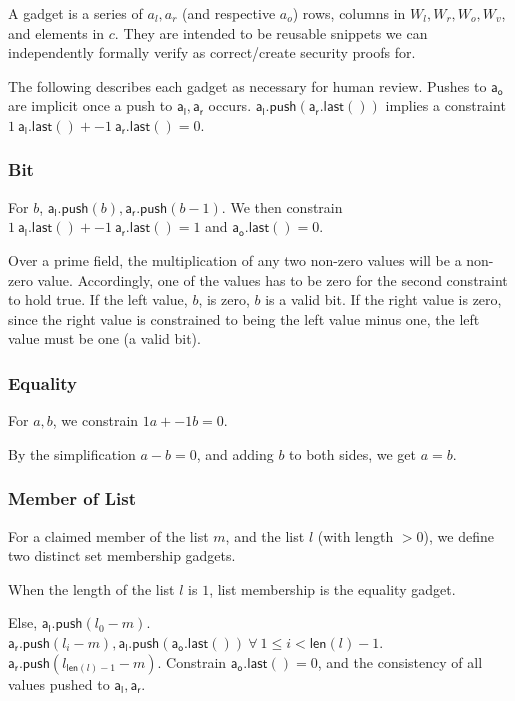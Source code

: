\documentclass[]{article}
\begin{document}
A gadget is a series of $a_l, a_r$ (and respective $a_o$) rows, columns in $W_l, W_r, W_o, W_v$, and elements in $c$. They are intended to be reusable snippets we can independently formally verify as correct/create security proofs for.

\newcommand{\al}{\mathsf{a_l.push}}
\newcommand{\ar}{\mathsf{a_r.push}}

\newcommand{\all}{\mathsf{a_l.last()}}
\newcommand{\arl}{\mathsf{a_r.last()}}
\newcommand{\aol}{\mathsf{a_o.last()}}

The following describes each gadget as necessary for human review. Pushes to $\mathsf{a_o}$ are implicit once a push to $\mathsf{a_l}, \mathsf{a_r}$ occurs. $\al(\arl)$ implies a constraint $1 ~\all + -1 ~\arl = 0$.

\subsubsection{Bit}

For $b$, $\al(b), \ar(b - 1)$. We then constrain $1 ~\all + -1 ~\arl = 1$ and $\aol = 0$.

Over a prime field, the multiplication of any two non-zero values will be a non-zero value. Accordingly, one of the values has to be zero for the second constraint to hold true. If the left value, $b$, is zero, $b$ is a valid bit. If the right value is zero, since the right value is constrained to being the left value minus one, the left value must be one (a valid bit).

\subsubsection{Equality}

For $a, b$, we constrain $1 a + -1 b = 0$.

By the simplification $a - b = 0$, and adding $b$ to both sides, we get $a = b$.

\subsubsection{Member of List}

For a claimed member of the list $m$, and the list $l$ (with length $> 0$), we define two distinct set membership gadgets.

When the length of the list $l$ is $1$, list membership is the equality gadget.

Else, $\al(l_0 - m)$. $\ar(l_i - m), \al(\aol) ~\forall~ 1 \le i < \mathsf{len}(l) - 1$. $\ar(l_{\mathsf{len}(l) - 1} - m)$. Constrain $\aol = 0$, and the consistency of all values pushed to $\mathsf{a_l}, \mathsf{a_r}$.
\end{document}
